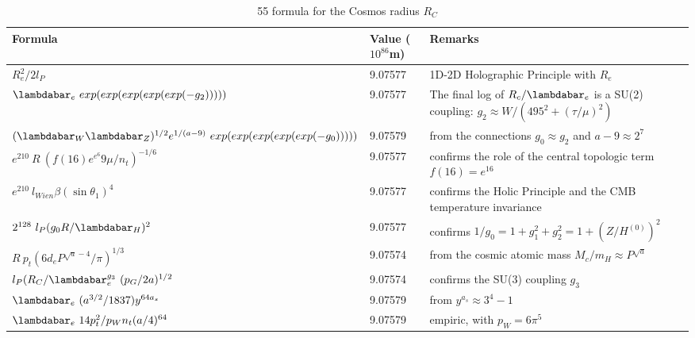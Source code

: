 \documentclass[a4paper,9pt]{article}
\newcounter{col}
\begin{document}
\begin{table}
\caption[Table \ref{CosmosTable}: 55 Cosmos radius formula]{55 formula for the Cosmos radius $R_C$}
\label{CosmosTable}
  \hskip-2.0cm\begin{tabular}{lll}
    \toprule
    \cmidrule(r){1-3}
    Formula     & Value ($10^{86}$m)  & Remarks \\
   \midrule
 
 $ R_e^2/2l_P $ & 9.07577 & 1D-2D Holographic Principle with $R_e$ \cite{Sanchez2}   \\
 
 $ \lambdabar_e ~ exp(exp(exp(exp(exp(-g_2)))))  $ & 9.07577 & The final log of $R_c/\lambdabar_e$ is a SU(2) coupling: $g_2 \approx W/(495^2+(\tau/\mu)^2)$  \\
 
 $ (\lambdabar_{W}\lambdabar_{Z})^{1/2}e^{1/(a-9)} ~ exp(exp(exp(exp(exp(-g_0)))))  $ & 9.07579 & from the connections $g_0 \approx g_2$ and $a - 9 \approx 2^7$ \\
 
 
 $ e^{210}~ R ~(f(16) e^{e^6} 9\mu/n_t)^{-1/6}  $ & 9.07577 & confirms the role of the central topologic term $f(16) = e^{16}$   \\
 
 $e^{210}~l_{Wien}\beta (\sin \theta_{1})^4$ & 9.07577 & confirms the Holic Principle and the CMB temperature invariance  \\
 
 $ 2^{128}~ l_P (g_0R/\lambdabar_H)^2 $ & 9.07577 & confirms $1/g_0 = 1+g_1^2 +g_2^2 = 1 + (Z/H^{(0)})^2$  \\
 
 
 
 
 $ R~p_t (6d_e P^{\sqrt a - 4}/\pi)^{1/3}$ & 9.07574 & from the cosmic atomic mass $M_c/m_H \approx P^{\sqrt a}$  \\
 
 
 
 $ l_P (R_C/\lambdabar_{e}^{g_3}~  (p_G/2a)^{1/2}$ & 9.07574 & confirms the SU(3) coupling $g_3$  \\
 
 
  $ \lambdabar_{e} ~(a^{3/2}/1837) y^{64a_s}$ & 9.07579 & from $y^{a_s} \approx 3^4 - 1$ \\
 
 $ \lambdabar_{e} ~14 p_t^2/p_Wn_t (a/4)^{64}$ & 9.07579 & empiric, with $p_W = 6\pi^5$ \\
 

\end{tabular}
\end{table}
\end{document}
